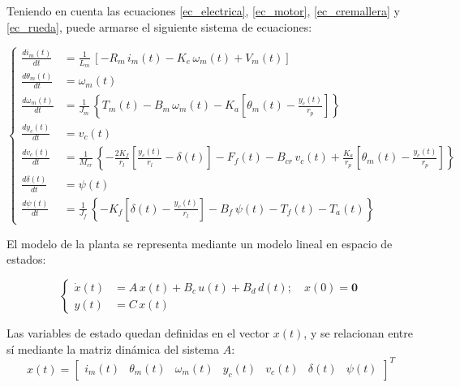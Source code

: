 \documentclass{article}
\begin{document}
Teniendo en cuenta las ecuaciones \ref{ec_electrica}, \ref{ec_motor}, \ref{ec_cremallera} y \ref{ec_rueda}, puede armarse el siguiente sistema de ecuaciones:


\begin{equation}
\left\{
\begin{aligned}
\frac{di_m(t)}{dt} &= \frac{1}{L_m} \,  \left[-R_m \, i_m(t) - K_e \, \omega_m(t) + V_m(t) \right] \\
\frac{d\theta_m(t)}{dt} &= \omega_m(t) \\
\frac{d\omega_m(t)}{dt} &= \frac{1}{J_m} \, \left\{T_m(t) - B_m \, \omega_m(t) - K_{a} \left[ \theta_m(t) - \frac{y_c(t)}{r_p} \right] \right\} \\
\frac{dy_c(t)}{dt} &= v_c(t) \\
\frac{dv_c(t)}{dt} &= \frac{1}{M_{cr}} \, \left\{ -\frac{2 K_f}{r_l} \left[ \frac{y_c(t)}{r_l} - \delta(t) \right] - F_f(t) - B_{cr} \, v_c(t) + \frac{K_a}{r_p} \left[ \theta_m(t) - \frac{y_c(t)}{r_p} \right] \right\} \\
\frac{d\delta(t)}{dt} &= \psi(t) \\
\frac{d\psi(t)}{dt} &= \frac{1}{J_f} \, \left\{ -K_f \left[ \delta(t) - \frac{y_c(t)}{r_l} \right] - B_f \, \psi(t) - T_f(t) - T_a(t) \right\}
\end{aligned}
\right.
\label{sistema_completo}
\end{equation}

El modelo de la planta se representa mediante un modelo lineal en espacio de estados:

\begin{equation}
\left\{
\begin{aligned}
\dot{x}(t) &= A \, x(t) + B_c \, u(t) + B_d \, d(t) ;\quad x(0) = \mathbf{0}\\
y(t) &= C \, x(t)
\end{aligned}
\right.
\label{ec_SS}
\end{equation}

Las variables de estado quedan definidas en el vector $x(t)$, y se relacionan entre sí mediante la matriz dinámica del sistema $A$:
\begin{equation*}
x(t) =
\begin{bmatrix}
i_m(t) &
\theta_m(t) &
\omega_m(t) &
y_c(t) &
v_c(t) &
\delta(t) &
\psi(t)
\end{bmatrix}^T
\end{equation*}
\end{document}
